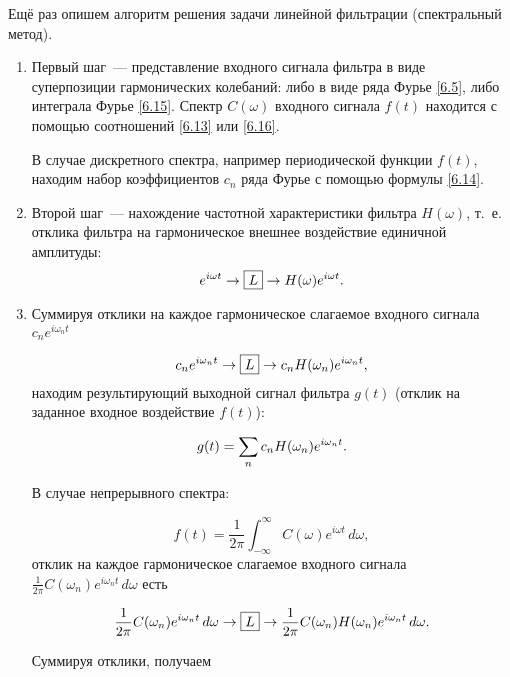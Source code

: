 Ещё раз опишем алгоритм решения задачи линейной фильтрации (спектральный метод).
\begin{enumerate} 
	\item Первый шаг~--- представление входного сигнала фильтра в виде суперпозиции гармонических колебаний: либо в виде ряда Фурье \eqref{6.5}, либо интеграла Фурье \eqref{6.15}. Спектр $C(\omega)$ входного сигнала $f(t)$ находится с помощью соотношений \eqref{6.13} или \eqref{6.16}.

В случае дискретного спектра, например периодической функции $f(t)$, находим набор коэффициентов $c_n$ ряда Фурье с
помощью формулы \eqref{6.14}.

	\item Второй шаг~--- нахождение частотной характеристики фильтра $H(\omega)$, т.~е. отклика фильтра на гармоническое
внешнее воздействие единичной амплитуды:
\begin{equation*}
	e^{i\omega t}\to\fbox{$L$}\to H(\omega)e^{i\omega t}.
\end{equation*}

	\item Суммируя отклики на каждое гармоническое слагаемое входного сигнала $c_n e^{i\omega_n t}$

\begin{equation*}
	c_n e^{i\omega_n t} \to\fbox{$L$}\to c_n H(\omega_n)e^{i\omega_n t},
\end{equation*}
находим результирующий выходной сигнал фильтра $g(t)$ (отклик на заданное входное воздействие $f(t)$):

\begin{equation}
	\eqmark{6.20}
	g(t)=\sum_n c_n H(\omega_n)e^{i\omega_n t}.
\end{equation}

В случае непрерывного спектра:

\begin{equation*}
	f(t)=\frac{1}{2\pi}\int_{-\infty}^\infty C(\omega)e^{i\omega t}\,d\omega,
\end{equation*}
отклик на каждое гармоническое слагаемое входного сигнала $\frac{1}{2\pi} C(\omega_n)e^{i\omega_n t}\,d\omega$ есть

\begin{equation*}
	\frac{1}{2\pi}C(\omega_n)e^{i\omega_n t}\,d\omega
\to\fbox{$L$}\to\frac{1}{2\pi}C(\omega_n)H(\omega_n)e^{i\omega_nt}\,d\omega.
\end{equation*}

Суммируя отклики, получаем


\end{enumerate}
